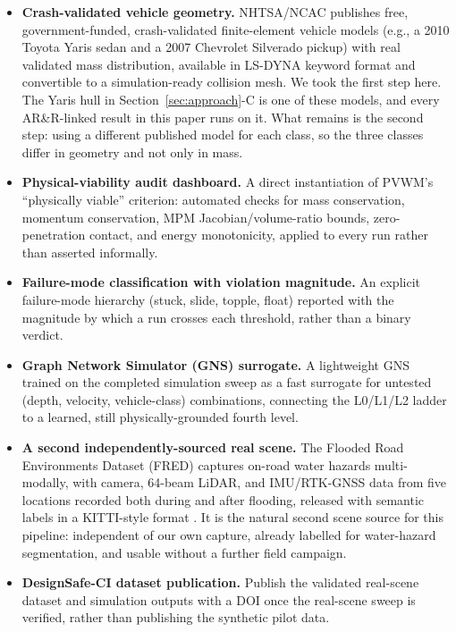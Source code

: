 \documentclass[conference]{IEEEtran}
\begin{document}
\begin{itemize}
\item \textbf{Crash-validated vehicle geometry.} NHTSA/NCAC publishes free, government-funded, crash-validated finite-element vehicle models (e.g., a 2010 Toyota Yaris sedan \cite{ccsa2016yaris} and a 2007 Chevrolet Silverado pickup) with real validated mass distribution, available in LS-DYNA keyword format and convertible to a simulation-ready collision mesh. We took the first step here. The Yaris hull in Section~\ref{sec:approach}-C is one of these models, and every AR\&R-linked result in this paper runs on it. What remains is the second step: using a different published model for each class, so the three classes differ in geometry and not only in mass.
\item \textbf{Physical-viability audit dashboard.} A direct instantiation of PVWM's ``physically viable'' criterion: automated checks for mass conservation, momentum conservation, MPM Jacobian/volume-ratio bounds, zero-penetration contact, and energy monotonicity, applied to every run rather than asserted informally.
\item \textbf{Failure-mode classification with violation magnitude.} An explicit failure-mode hierarchy (stuck, slide, topple, float) reported with the magnitude by which a run crosses each threshold, rather than a binary verdict.
\item \textbf{Graph Network Simulator (GNS) surrogate.} A lightweight GNS trained on the completed simulation sweep as a fast surrogate for untested (depth, velocity, vehicle-class) combinations, connecting the L0/L1/L2 ladder to a learned, still physically-grounded fourth level.
\item \textbf{A second independently-sourced real scene.} The Flooded Road Environments Dataset (FRED) captures on-road water hazards multi-modally, with camera, 64-beam LiDAR, and IMU/RTK-GNSS data from five locations recorded both during and after flooding, released with semantic labels in a KITTI-style format \cite{fred2026}. It is the natural second scene source for this pipeline: independent of our own capture, already labelled for water-hazard segmentation, and usable without a further field campaign.
\item \textbf{DesignSafe-CI dataset publication.} Publish the validated real-scene dataset and simulation outputs with a DOI once the real-scene sweep is verified, rather than publishing the synthetic pilot data.
\end{itemize}
\end{document}
